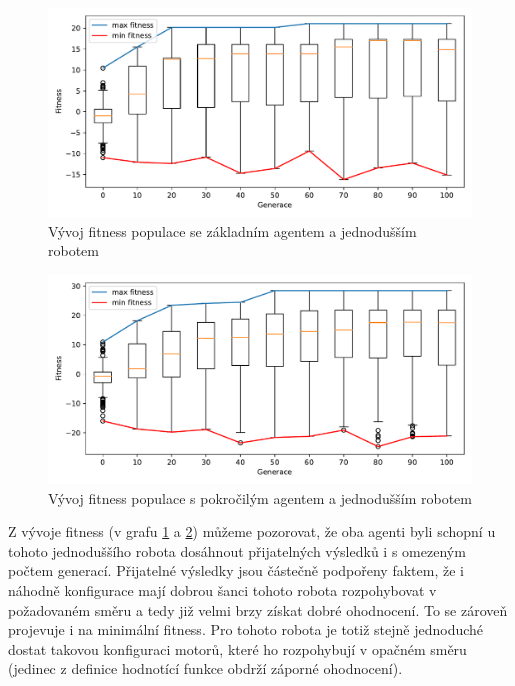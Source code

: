 \begin{figure}[h!]
    \centering
    \includegraphics[width=1\textwidth]{../img/experiment1_2_Sine_10ticks.pdf}
    \caption{Vývoj fitness populace se základním agentem a jednodušším robotem}
    \label{exp:first2_sinefull}
\end{figure}
\begin{figure}[h!]
    \includegraphics[width=1\textwidth]{../img/experiment1_2_TFS_10ticks.pdf}
    \caption{Vývoj fitness populace s pokročilým agentem a jednodušším robotem}
    \label{exp:first2_TFS}
\end{figure}

\pagebreak
Z vývoje fitness (v grafu \ref{exp:first2_sinefull} a \ref{exp:first2_TFS})
můžeme pozorovat, že oba agenti byli schopní u tohoto jednoduššího robota
dosáhnout přijatelných výsledků i s omezeným počtem generací. Přijatelné
výsledky jsou částečně podpořeny faktem, že i náhodně konfigurace mají dobrou
šanci tohoto robota rozpohybovat v požadovaném směru a tedy již velmi brzy
získat dobré ohodnocení. To se zároveň projevuje i na minimální fitness. Pro
tohoto robota je totiž stejně jednoduché dostat takovou konfiguraci motorů,
které ho rozpohybují v opačném směru (jedinec z definice hodnotící funkce
obdrží záporné ohodnocení).

